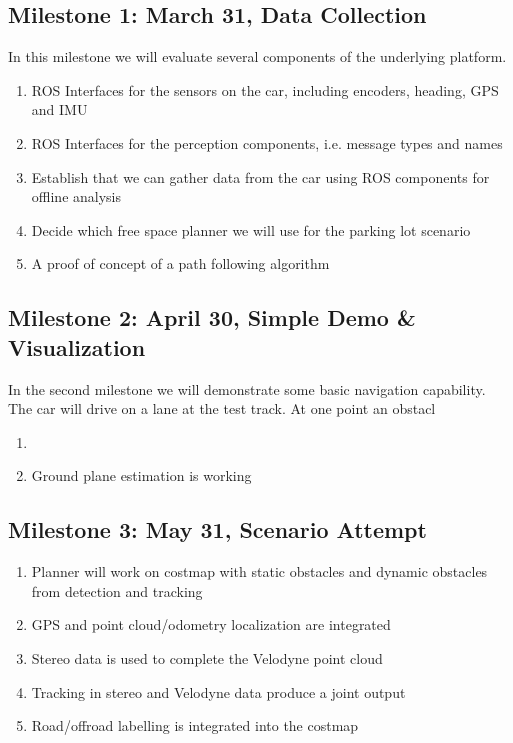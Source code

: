\documentclass[11pt,a4paper]{article}
\begin{document}
\subsection{Milestone 1: March 31, Data Collection}
\label{milestone1}

In this milestone we will evaluate several components of the underlying platform.

\begin{enumerate}
\item ROS Interfaces for the sensors on the car, including encoders, heading, GPS and IMU
\item ROS Interfaces for the perception components, i.e. message types and names
\item Establish that we can gather data from the car using ROS components for offline analysis
\item Decide which free space planner we will use for the parking lot scenario
\item A proof of concept of a path following algorithm
\end{enumerate}

\subsection{Milestone 2: April 30, Simple Demo \& Visualization}
\label{milestone2}

In the second milestone we will demonstrate some basic navigation capability.
The car will drive on a lane at the test track. At one point an
obstacl

\begin{enumerate}
\item 
\item Ground plane estimation is working
\end{enumerate}

\subsection{Milestone 3: May 31, Scenario Attempt}
\label{milestone3}

\begin{enumerate}
\item Planner will work on costmap with static obstacles and dynamic obstacles from detection and tracking
\item GPS and point cloud/odometry localization are integrated
\item Stereo data is used to complete the Velodyne point cloud
\item Tracking in stereo and Velodyne data produce a joint output
\item Road/offroad labelling is integrated into the costmap
\end{enumerate}
\end{document}

